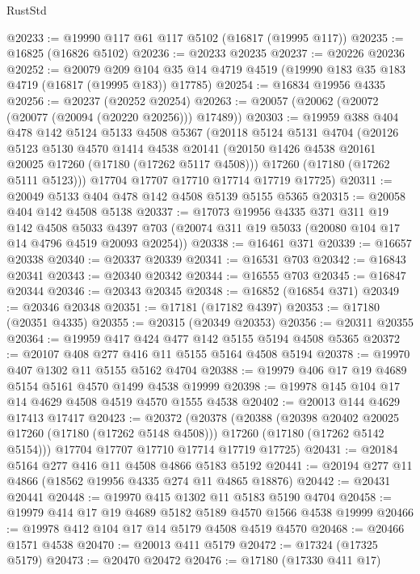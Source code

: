 \begin{lexlean}{RustStd}
\begin{coremodule}
@20233 := @19990 @117 @61 @117 @5102 (@16817 (@19995 @117))
@20235 := @16825 (@16826 @5102)
@20236 := @20233 @20235
@20237 := @20226 @20236
@20252 := @20079
    @209
    @104
    @35
    @14
    @4719
    @4519
    (@19990 @183 @35 @183 @4719 (@16817 (@19995 @183)) @17785)
@20254 := @16834 @19956 @4335
@20256 := @20237 (@20252 @20254)
@20263 := @20057 (@20062 (@20072 (@20077 (@20094 (@20220 @20256))) @17489))
@20303 := @19959
    @388
    @404
    @478
    @142
    @5124
    @5133
    @4508
    @5367
    (@20118
      @5124
      @5131
      @4704
      (@20126
        @5123
        @5130
        @4570
        @1414
        @4538
        @20141
        (@20150 @1426 @4538 @20161 @20025 @17260 (@17180 (@17262 @5117 @4508)))
        @17260
        (@17180 (@17262 @5111 @5123)))
      @17704
      @17707
      @17710
      @17714
      @17719
      @17725)
@20311 := @20049 @5133 @404 @478 @142 @4508 @5139 @5155 @5365
@20315 := @20058 @404 @142 @4508 @5138
@20337 := @17073
    @19956
    @4335
    @371
    @311
    @19
    @142
    @4508
    @5033
    @4397
    @703
    (@20074 @311 @19 @5033 (@20080 @104 @17 @14 @4796 @4519 @20093 @20254))
@20338 := @16461 @371
@20339 := @16657 @20338
@20340 := @20337 @20339
@20341 := @16531 @703
@20342 := @16843 @20341
@20343 := @20340 @20342
@20344 := @16555 @703
@20345 := @16847 @20344
@20346 := @20343 @20345
@20348 := @16852 (@16854 @371)
@20349 := @20346 @20348
@20351 := @17181 (@17182 @4397)
@20353 := @17180 (@20351 @4335)
@20355 := @20315 (@20349 @20353)
@20356 := @20311 @20355
@20364 := @19959 @417 @424 @477 @142 @5155 @5194 @4508 @5365
@20372 := @20107 @408 @277 @416 @11 @5155 @5164 @4508 @5194
@20378 := @19970 @407 @1302 @11 @5155 @5162 @4704
@20388 := @19979 @406 @17 @19 @4689 @5154 @5161 @4570 @1499 @4538 @19999
@20398 := @19978 @145 @104 @17 @14 @4629 @4508 @4519 @4570 @1555 @4538
@20402 := @20013 @144 @4629 @17413 @17417
@20423 := @20372
    (@20378
      (@20388
        (@20398 @20402 @20025 @17260 (@17180 (@17262 @5148 @4508)))
        @17260
        (@17180 (@17262 @5142 @5154)))
      @17704
      @17707
      @17710
      @17714
      @17719
      @17725)
@20431 := @20184 @5164 @277 @416 @11 @4508 @4866 @5183 @5192
@20441 := @20194 @277 @11 @4866 (@18562 @19956 @4335 @274 @11 @4865 @18876)
@20442 := @20431 @20441
@20448 := @19970 @415 @1302 @11 @5183 @5190 @4704
@20458 := @19979 @414 @17 @19 @4689 @5182 @5189 @4570 @1566 @4538 @19999
@20466 := @19978 @412 @104 @17 @14 @5179 @4508 @4519 @4570
@20468 := @20466 @1571 @4538
@20470 := @20013 @411 @5179
@20472 := @17324 (@17325 @5179)
@20473 := @20470 @20472
@20476 := @17180 (@17330 @411 @17)

\end{coremodule}
\end{lexlean}
